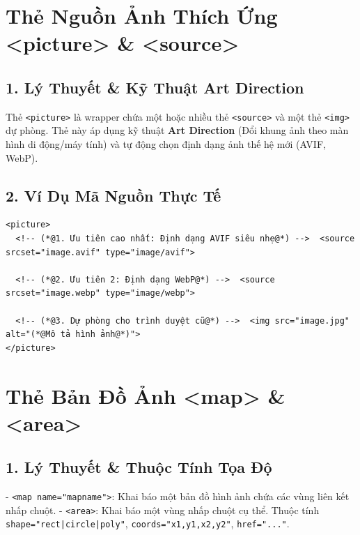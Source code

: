\documentclass[11pt,oneside]{book}
\newcommand{\codeinline}[1]{\textcolor{accentOrange}{\texttt{#1}}}
\newcommand{\term}[1]{\textbf{\textcolor{primaryBlue}{#1}}}
\begin{document}
\section{Thẻ Nguồn Ảnh Thích Ứng <picture> \& <source>}
\subsection{1. Lý Thuyết \& Kỹ Thuật Art Direction}
Thẻ \codeinline{<picture>} là wrapper chứa một hoặc nhiều thẻ \codeinline{<source>} và một thẻ \codeinline{<img>} dự phòng. Thẻ này áp dụng kỹ thuật \term{Art Direction} (Đổi khung ảnh theo màn hình di động/máy tính) và tự động chọn định dạng ảnh thế hệ mới (AVIF, WebP).

\subsection{2. Ví Dụ Mã Nguồn Thực Tế}
\begin{lstlisting}[language=HTML5, caption={Ví dụ đổi định dạng ảnh AVIF/WebP với thẻ picture}]
<picture>
  <!-- (*@1. Ưu tiên cao nhất: Định dạng AVIF siêu nhẹ@*) -->  <source srcset="image.avif" type="image/avif">
  
  <!-- (*@2. Ưu tiên 2: Định dạng WebP@*) -->  <source srcset="image.webp" type="image/webp">
  
  <!-- (*@3. Dự phòng cho trình duyệt cũ@*) -->  <img src="image.jpg" alt="(*@Mô tả hình ảnh@*)">
</picture>
\end{lstlisting}

\section{Thẻ Bản Đồ Ảnh <map> \& <area>}
\subsection{1. Lý Thuyết \& Thuộc Tính Tọa Độ}
- \codeinline{<map name="mapname">}: Khai báo một bản đồ hình ảnh chứa các vùng liên kết nhấp chuột.
- \codeinline{<area>}: Khai báo một vùng nhấp chuột cụ thể. Thuộc tính \codeinline{shape="rect|circle|poly"}, \codeinline{coords="x1,y1,x2,y2"}, \codeinline{href="..."}.
\end{document}
